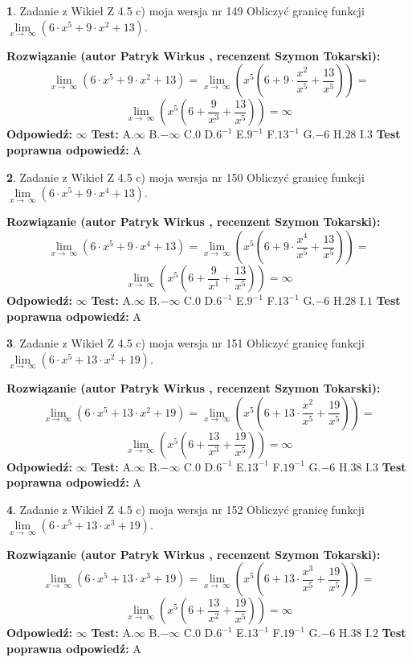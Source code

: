 \documentclass[12pt, a4paper]{article}
\theoremstyle{definition} %
\newtheorem{zad}{}
\newcommand{\zadStart}[1]{\begin{zad}#1\newline}
\newcommand{\zadStop}{\end{zad}}
\newcommand{\rozwStart}[2]{\noindent \textbf{Rozwiązanie (autor #1 , recenzent #2): }\newline}
\newcommand{\rozwStop}{\newline}
\newcommand{\odpStart}{\noindent \textbf{Odpowiedź:}\newline}
\newcommand{\odpStop}{\newline}
\newcommand{\testStart}{\noindent \textbf{Test:}\newline}
\newcommand{\testStop}{\newline}
\newcommand{\kluczStart}{\noindent \textbf{Test poprawna odpowiedź:}\newline}
\newcommand{\kluczStop}{\newline}
\begin{document}
\zadStart{Zadanie z Wikieł Z 4.5 c) moja wersja nr 149}
Obliczyć granicę funkcji  $\lim\limits_{x\to\ \infty}(6 \cdot x^{5}+9 \cdot x^{2}+13)$.
\zadStop
\rozwStart{Patryk Wirkus}{Szymon Tokarski}
$$\lim\limits_{x\to\ \infty}(6 \cdot x^{5}+9 \cdot x^{2}+13) = \lim\limits_{x\to\ \infty}(x^{5}(6 +9 \cdot \frac{x^{2}}{x^{5}}+\frac{13}{x^{5}})) =$$ $$\lim\limits_{x\to\ \infty}(x^{5}(6 +\frac{9}{x^{3}}+\frac{13}{x^{5}})) =\infty$$
\rozwStop
\odpStart
$\infty$
\odpStop
\testStart
A.$\infty$ B.$-\infty$ C.$0$ D.$6^{-1}$ E.$9^{-1}$
F.$13^{-1}$ G.$-6$
H.$28$
I.$3$
\testStop
\kluczStart
A
\kluczStop



\zadStart{Zadanie z Wikieł Z 4.5 c) moja wersja nr 150}
Obliczyć granicę funkcji  $\lim\limits_{x\to\ \infty}(6 \cdot x^{5}+9 \cdot x^{4}+13)$.
\zadStop
\rozwStart{Patryk Wirkus}{Szymon Tokarski}
$$\lim\limits_{x\to\ \infty}(6 \cdot x^{5}+9 \cdot x^{4}+13) = \lim\limits_{x\to\ \infty}(x^{5}(6 +9 \cdot \frac{x^{4}}{x^{5}}+\frac{13}{x^{5}})) =$$ $$\lim\limits_{x\to\ \infty}(x^{5}(6 +\frac{9}{x^{1}}+\frac{13}{x^{5}})) =\infty$$
\rozwStop
\odpStart
$\infty$
\odpStop
\testStart
A.$\infty$ B.$-\infty$ C.$0$ D.$6^{-1}$ E.$9^{-1}$
F.$13^{-1}$ G.$-6$
H.$28$
I.$1$
\testStop
\kluczStart
A
\kluczStop



\zadStart{Zadanie z Wikieł Z 4.5 c) moja wersja nr 151}
Obliczyć granicę funkcji  $\lim\limits_{x\to\ \infty}(6 \cdot x^{5}+13 \cdot x^{2}+19)$.
\zadStop
\rozwStart{Patryk Wirkus}{Szymon Tokarski}
$$\lim\limits_{x\to\ \infty}(6 \cdot x^{5}+13 \cdot x^{2}+19) = \lim\limits_{x\to\ \infty}(x^{5}(6 +13 \cdot \frac{x^{2}}{x^{5}}+\frac{19}{x^{5}})) =$$ $$\lim\limits_{x\to\ \infty}(x^{5}(6 +\frac{13}{x^{3}}+\frac{19}{x^{5}})) =\infty$$
\rozwStop
\odpStart
$\infty$
\odpStop
\testStart
A.$\infty$ B.$-\infty$ C.$0$ D.$6^{-1}$ E.$13^{-1}$
F.$19^{-1}$ G.$-6$
H.$38$
I.$3$
\testStop
\kluczStart
A
\kluczStop



\zadStart{Zadanie z Wikieł Z 4.5 c) moja wersja nr 152}
Obliczyć granicę funkcji  $\lim\limits_{x\to\ \infty}(6 \cdot x^{5}+13 \cdot x^{3}+19)$.
\zadStop
\rozwStart{Patryk Wirkus}{Szymon Tokarski}
$$\lim\limits_{x\to\ \infty}(6 \cdot x^{5}+13 \cdot x^{3}+19) = \lim\limits_{x\to\ \infty}(x^{5}(6 +13 \cdot \frac{x^{3}}{x^{5}}+\frac{19}{x^{5}})) =$$ $$\lim\limits_{x\to\ \infty}(x^{5}(6 +\frac{13}{x^{2}}+\frac{19}{x^{5}})) =\infty$$
\rozwStop
\odpStart
$\infty$
\odpStop
\testStart
A.$\infty$ B.$-\infty$ C.$0$ D.$6^{-1}$ E.$13^{-1}$
F.$19^{-1}$ G.$-6$
H.$38$
I.$2$
\testStop
\kluczStart
A
\kluczStop
\end{document}
